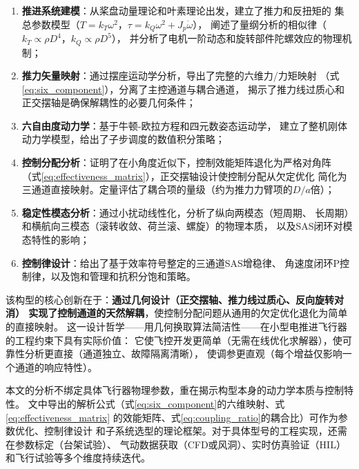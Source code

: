 \documentclass[a4paper,12pt]{ctexart}
\theoremstyle{plain}
\theoremstyle{definition}
\begin{document}
\begin{enumerate}[label=(\arabic*)]
    \item \textbf{推进系统建模}：从桨盘动量理论和叶素理论出发，建立了推力和反扭矩的
          集总参数模型（$T = k_T\omega^2$，$\tau = k_Q\omega^2 + J_p\dot{\omega}$），
          阐述了量纲分析的相似律（$k_T \propto \rho D^4$，$k_Q \propto \rho D^5$），
          并分析了电机一阶动态和旋转部件陀螺效应的物理机制；
    \item \textbf{推力矢量映射}：通过摆座运动学分析，导出了完整的六维力/力矩映射
          （式\ref{eq:six_component}），分离了主控通道与耦合通道，
          揭示了推力线过质心和正交摆轴是确保解耦性的必要几何条件；
    \item \textbf{六自由度动力学}：基于牛顿-欧拉方程和四元数姿态运动学，
          建立了整机刚体动力学模型，给出了子步调度的数值积分策略；
    \item \textbf{控制分配分析}：证明了在小角度近似下，控制效能矩阵退化为严格对角阵
          （式\ref{eq:effectiveness_matrix}），正交摆轴设计使控制分配从欠定优化
          简化为三通道直接映射。定量评估了耦合项的量级（约为推力力臂项的$D/a$倍）；
    \item \textbf{稳定性模态分析}：通过小扰动线性化，分析了纵向两模态（短周期、
          长周期）和横航向三模态（滚转收敛、荷兰滚、螺旋）的物理本质，
          以及SAS闭环对模态特性的影响；
    \item \textbf{控制律设计}：给出了基于效率符号整定的三通道SAS增稳律、
          角速度闭环P控制律，以及饱和管理和抗积分饱和策略。
\end{enumerate}

该构型的核心创新在于：\textbf{通过几何设计（正交摆轴、推力线过质心、反向旋转对消）
实现了控制通道的天然解耦}，使控制分配问题从通用的欠定优化退化为简单的直接映射。
这一设计哲学——用几何换取算法简洁性——在小型电推进飞行器的工程约束下具有实际价值：
它使飞控开发更简单（无需在线优化求解器），使可靠性分析更直接（通道独立、故障隔离清晰），
使调参更直观（每个增益仅影响一个通道的响应特性）。

本文的分析不绑定具体飞行器物理参数，重在揭示构型本身的动力学本质与控制特性。
文中导出的解析公式（式\ref{eq:six_component}的六维映射、式\ref{eq:effectiveness_matrix}
的效能矩阵、式\ref{eq:coupling_ratio}的耦合比）可作为参数优化、控制律设计
和子系统选型的理论框架。对于具体型号的工程实现，还需在参数标定（台架试验）、
气动数据获取（CFD或风洞）、实时仿真验证（HIL）和飞行试验等多个维度持续迭代。
\end{document}
